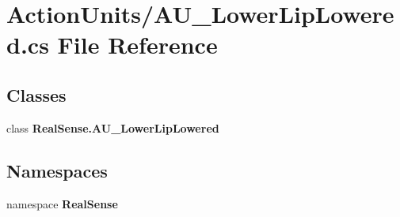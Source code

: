 \section{Action\+Units/\+A\+U\+\_\+\+Lower\+Lip\+Lowered.cs File Reference}
\label{_a_u___lower_lip_lowered_8cs}
\subsection*{Classes}
\begin{DoxyCompactItemize}
\item 
class \textbf{ Real\+Sense.\+A\+U\+\_\+\+Lower\+Lip\+Lowered}
\end{DoxyCompactItemize}
\subsection*{Namespaces}
\begin{DoxyCompactItemize}
\item 
namespace \textbf{ Real\+Sense}
\end{DoxyCompactItemize}
